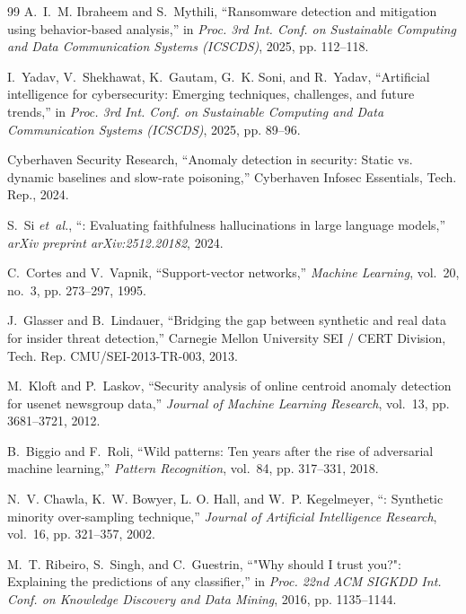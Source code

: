 \documentclass[12pt,a4paper]{report}
\begin{document}
\begin{thebibliography}{99}
A.~I.~M. Ibraheem and S.~Mythili, ``Ransomware detection and mitigation using behavior-based analysis,'' in \emph{Proc. 3rd Int. Conf. on Sustainable Computing and Data Communication Systems (ICSCDS)}, 2025, pp. 112--118.

I.~Yadav, V.~Shekhawat, K.~Gautam, G.~K. Soni, and R.~Yadav, ``Artificial intelligence for cybersecurity: Emerging techniques, challenges, and future trends,'' in \emph{Proc. 3rd Int. Conf. on Sustainable Computing and Data Communication Systems (ICSCDS)}, 2025, pp. 89--96.

{Cyberhaven Security Research}, ``Anomaly detection in security: Static vs. dynamic baselines and slow-rate poisoning,'' Cyberhaven Infosec Essentials, Tech. Rep., 2024.

S.~Si \emph{et~al.}, ``: Evaluating faithfulness hallucinations in large language models,'' \emph{arXiv preprint arXiv:2512.20182}, 2024.

C.~Cortes and V.~Vapnik, ``Support-vector networks,'' \emph{Machine Learning}, vol.~20, no.~3, pp. 273--297, 1995.

J.~Glasser and B.~Lindauer, ``Bridging the gap between synthetic and real data for insider threat detection,'' Carnegie Mellon University SEI / CERT Division, Tech. Rep. CMU/SEI-2013-TR-003, 2013.

M.~Kloft and P.~Laskov, ``Security analysis of online centroid anomaly detection for usenet newsgroup data,'' \emph{Journal of Machine Learning Research}, vol.~13, pp. 3681--3721, 2012.

B.~Biggio and F.~Roli, ``Wild patterns: Ten years after the rise of adversarial machine learning,'' \emph{Pattern Recognition}, vol.~84, pp. 317--331, 2018.

N.~V. Chawla, K.~W. Bowyer, L. O. Hall, and W.~P. Kegelmeyer, ``: Synthetic minority over-sampling technique,'' \emph{Journal of Artificial Intelligence Research}, vol.~16, pp. 321--357, 2002.

M.~T. Ribeiro, S.~Singh, and C.~Guestrin, ``"Why should I trust you?": Explaining the predictions of any classifier,'' in \emph{Proc. 22nd ACM SIGKDD Int. Conf. on Knowledge Discovery and Data Mining}, 2016, pp. 1135--1144.

\end{thebibliography}
\end{document}
